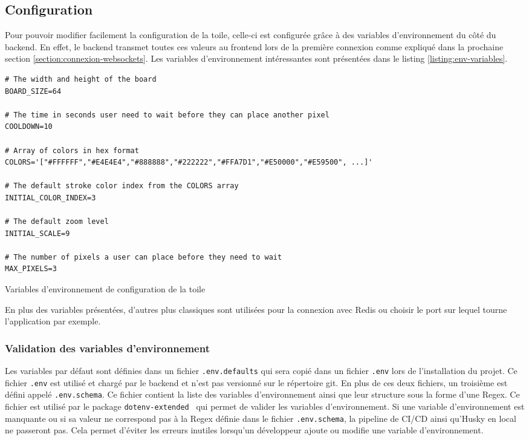 \subsection{Configuration}

Pour pouvoir modifier facilement la configuration de la toile, celle-ci est configurée grâce à des variables d'environnement du côté du backend. En effet, le backend transmet toutes ces valeurs au frontend lors de la première connexion comme expliqué dans la prochaine section \ref{section:connexion-websockets}. Les variables d'environnement intéressantes sont présentées dans le listing \ref{listing:env-variables}.

\begin{listing}[H]
  \begin{verbatim}
# The width and height of the board
BOARD_SIZE=64

# The time in seconds user need to wait before they can place another pixel
COOLDOWN=10

# Array of colors in hex format
COLORS='["#FFFFFF","#E4E4E4","#888888","#222222","#FFA7D1","#E50000","#E59500", ...]'

# The default stroke color index from the COLORS array
INITIAL_COLOR_INDEX=3

# The default zoom level
INITIAL_SCALE=9

# The number of pixels a user can place before they need to wait
MAX_PIXELS=3
\end{verbatim}
  \caption{Variables d'environnement de configuration de la toile}
  \label{listing:env-variables}
\end{listing}

En plus des variables présentées, d'autres plus classiques sont utilisées pour la connexion avec Redis ou choisir le port sur lequel tourne l'application par exemple.

\subsubsection{Validation des variables d'environnement}

Les variables par défaut sont définies dans un fichier \texttt{.env.defaults} qui sera copié dans un fichier \texttt{.env} lors de l'installation du projet. Ce fichier \texttt{.env} est utilisé et chargé par le backend et n'est pas versionné sur le répertoire git. En plus de ces deux fichiers, un troisième est défini appelé \texttt{.env.schema}. Ce fichier contient la liste des variables d'environnement ainsi que leur structure sous la forme d'une Regex. Ce fichier est utilisé par le package \texttt{dotenv-extended}~\cite{dotenv-extended} qui permet de valider les variables d'environnement. Si une variable d'environnement est manquante ou si sa valeur ne correspond pas à la Regex définie dans le fichier \texttt{.env.schema}, la pipeline de CI/CD ainsi qu'Husky en local ne passeront pas. Cela permet d'éviter les erreurs inutiles lorsqu'un développeur ajoute ou modifie une variable d'environnement.

